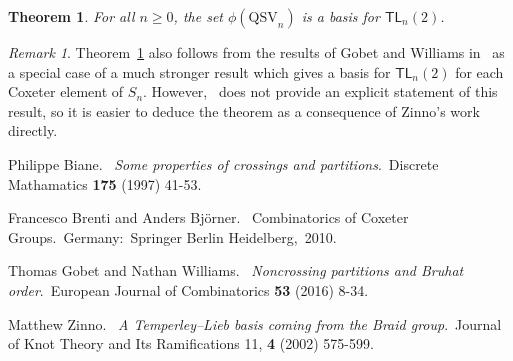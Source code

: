 \documentclass[12pt]{article}
\newtheorem{thm}[equation]{Theorem}
\theoremstyle{definition}
\theoremstyle{remark}
\newtheorem{rem}[equation]{Remark}
\numberwithin{equation}{section}
\newcommand{\TL}{\mathsf{TL}}
\newcommand{\QSV}{\mathrm{QSV}}
\begin{document}
\begin{thm}
\label{thm:TLbasis}
For all $n \ge 0$, the set $\phi(\QSV_{n})$ is a basis for $\TL_{n}(2)$.
\end{thm}

\begin{rem}
Theorem~\ref{thm:TLbasis} also follows from the results of Gobet and Williams in~\cite{GobetWilliams} as a special case of a much stronger result which gives a basis for $\TL_{n}(2)$ for each Coxeter element of $S_{n}$.  
However,~\cite{GobetWilliams} does not provide an explicit statement of this result, so it is easier to deduce the theorem as a consequence of Zinno's work directly.
\end{rem}


\begin{thebibliography}{99}
  Philippe Biane.  \textit{Some properties of crossings and partitions}. Discrete Mathamatics {\bf 175} (1997) 41-53.

  Francesco Brenti and Anders Bj\"{o}rner.  Combinatorics of Coxeter Groups. Germany: Springer Berlin Heidelberg, 2010.

  Thomas Gobet and Nathan Williams.  \textit{Noncrossing partitions and Bruhat order}. European Journal of Combinatorics {\bf 53} (2016) 8-34.

  Matthew Zinno.  \textit{A Temperley--Lieb basis coming from the Braid group}. Journal of Knot Theory and Its Ramifications 11, {\bf 4} (2002) 575-599.

\end{thebibliography}
\end{document}
